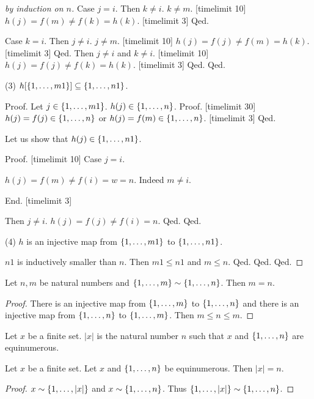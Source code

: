 \documentclass{article}
\begin{document}
\begin{forthel}
\begin{proof}[by induction on $n$]
  Case $j = i$.
  Then $k \neq i$. $k \neq m$. [timelimit 10]
  $h(j) = f(m) \neq f(k) = h(k)$. [timelimit 3]
  Qed.
  
  Case $k = i$.
  Then $j \neq i$. $j \neq m$. [timelimit 10]
  $h(j) = f(j) \neq f(m) = h(k)$. [timelimit 3]
  Qed.
  Then $j \neq i$ and $k \neq i$. [timelimit 10]
  $h(j) = f(j) \neq f(k) = h(k)$. [timelimit 3]
  Qed.
  Qed.
  
(3)  $h[\{1,\dots,m1\}] \subseteq \{1,\dots,n1\}$.
  
Proof.
  Let $j \in \{1,\dots,m1\}$.
  $h(j) \in \{1,\dots,n\}$.
  Proof.
  [timelimit 30]
  $h(j) = f(j) \in \{1,\dots,n\}$ or $h(j) = f(m) \in \{1,\dots,n\}$.
  [timelimit 3]
  Qed.
  
  Let us show that  $h(j) \in \{1,\dots,n1\}$.

  Proof.
[timelimit 10]
    Case $j = i$.

    $h(j) = f(m) \neq f(i) = w = n$. Indeed $m \neq i$.

End.
[timelimit 3]

    Then $j \neq i$.
    $h(j) = f(j) \neq f(i) = n$.
  Qed.
  Qed.
    
(4) $h$ is an injective map from $\{1,\dots,m1\}$ to $\{1,\dots,n1\}$. 
  
  $n1$ is inductively smaller than $n$.
Then $m1 \leq n1$ and $m \leq n$.
  Qed.
  Qed.
  Qed.
  \end{proof}
  
  
  \begin{lemma}
  Let $n,m$ be natural numbers and
  $\{1,\dots,m\} \sim \{1,\dots,n\}$. Then $m = n$.
  \end{lemma}
  \begin{proof}
  There is an injective map from 
  $\{1,\dots,m\}$ to $\{1,\dots,n\}$ and
  there is an injective map from 
  $\{1,\dots,n\}$ to $\{1,\dots,m\}$. Then $m \leq n \leq m$.
  \end{proof}
  
  \begin{signature}
  Let $x$ be a finite set. $|x|$ is the natural number $n$
  such that $x$ and $\{1,\dots,n\}$ are equinumerous.
  \end{signature}
  
  \begin{lemma} Let $x$ be a finite set.
  Let $x$ and $\{1,\dots,n\}$ be equinumerous. Then
  $|x| = n$.
  \end{lemma}
  \begin{proof}
  $x \sim \{1,\dots,|x|\}$ and $x \sim \{1,\dots,n\}$. Thus $\{1,\dots,|x|\} \sim \{1,\dots,n\}$.
  \end{proof}
  

\end{forthel}
\end{document}
